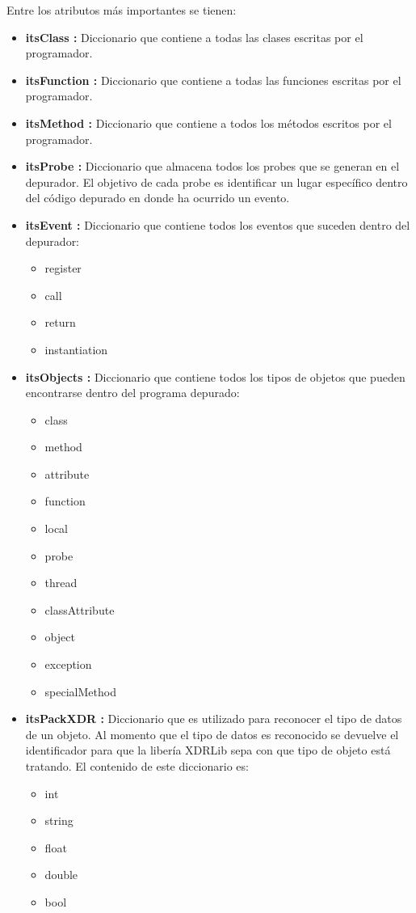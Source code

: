 \documentclass[12pt,legalpaper]{report}
\begin{document}
Entre los atributos más importantes se tienen:
\begin{itemize}
	\item \textbf{itsClass :} Diccionario que contiene a todas las clases escritas por el programador.
	\item \textbf{itsFunction :} Diccionario que contiene a todas las funciones escritas por el programador.
	\item \textbf{itsMethod :} Diccionario que contiene a todos los métodos escritos por el programador.
	\item \textbf{itsProbe :} Diccionario que almacena todos los probes que se generan en el depurador.  El objetivo de cada probe es identificar un lugar específico dentro del código depurado en donde ha ocurrido un evento.
	\item \textbf{itsEvent :} Diccionario que contiene todos los eventos que suceden dentro del depurador:
	\begin{itemize}
		\item register
		\item call
		\item return
		\item instantiation
	\end{itemize}
	
	\item \textbf{itsObjects :} Diccionario que contiene todos los tipos de objetos que pueden encontrarse dentro del programa depurado:
	\begin{itemize}
		\item class
		\item method
		\item attribute
		\item function
		\item local
		\item probe
		\item thread
		\item classAttribute
		\item object
		\item exception
		\item specialMethod
	\end{itemize}	
	
	\item \textbf{itsPackXDR :} Diccionario que es utilizado para reconocer el tipo de datos de un objeto.  Al momento que el tipo de datos es reconocido se devuelve el identificador para que la libería XDRLib sepa con que tipo de objeto está tratando.  El contenido de este diccionario es:
	\begin{itemize}
		\item int
		\item string
		\item float
		\item double
		\item bool	
	\end{itemize}
	

\end{itemize}
\end{document}
